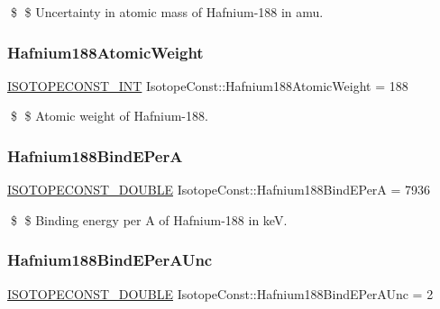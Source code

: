\$ \$ Uncertainty in atomic mass of Hafnium-\/188 in amu. \mbox{\label{group___isotope_const-_hafnium-_hf188_gaf9a0f014a4803d87e67debad0b239f9f}} 
\subsubsection{\texorpdfstring{Hafnium188\+Atomic\+Weight}{Hafnium188AtomicWeight}}
{\footnotesize\ttfamily \mbox{\hyperlink{group___isotope_const-_macros_ga5f18360b3e99483a35c32d789e62621c}{I\+S\+O\+T\+O\+P\+E\+C\+O\+N\+S\+T\+\_\+\+I\+NT}} Isotope\+Const\+::\+Hafnium188\+Atomic\+Weight = 188}

\$ \$ Atomic weight of Hafnium-\/188. \mbox{\label{group___isotope_const-_hafnium-_hf188_ga05860018dd0cce1c01367a3e77cf94c0}} 
\subsubsection{\texorpdfstring{Hafnium188\+Bind\+E\+PerA}{Hafnium188BindEPerA}}
{\footnotesize\ttfamily \mbox{\hyperlink{group___isotope_const-_macros_ga8f45a7272ce02c0b4c65c44636ed719a}{I\+S\+O\+T\+O\+P\+E\+C\+O\+N\+S\+T\+\_\+\+D\+O\+U\+B\+LE}} Isotope\+Const\+::\+Hafnium188\+Bind\+E\+PerA = 7936}

\$ \$ Binding energy per A of Hafnium-\/188 in keV. \mbox{\label{group___isotope_const-_hafnium-_hf188_ga0639263bcd82f76159908072b642ba3c}} 
\subsubsection{\texorpdfstring{Hafnium188\+Bind\+E\+Per\+A\+Unc}{Hafnium188BindEPerAUnc}}
{\footnotesize\ttfamily \mbox{\hyperlink{group___isotope_const-_macros_ga8f45a7272ce02c0b4c65c44636ed719a}{I\+S\+O\+T\+O\+P\+E\+C\+O\+N\+S\+T\+\_\+\+D\+O\+U\+B\+LE}} Isotope\+Const\+::\+Hafnium188\+Bind\+E\+Per\+A\+Unc = 2}

